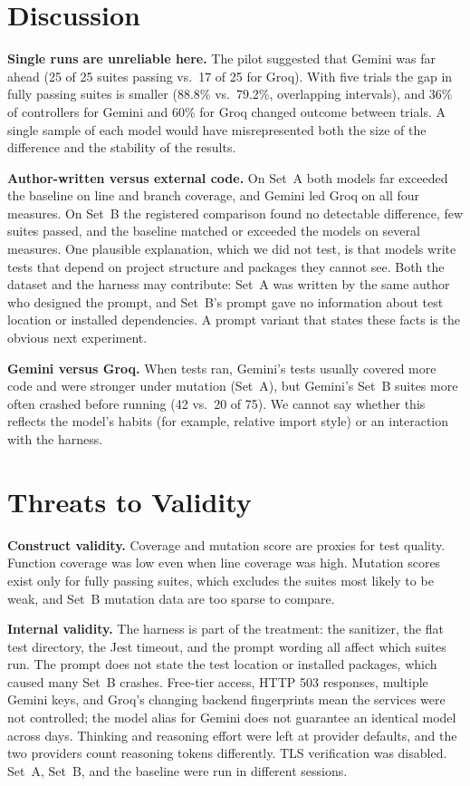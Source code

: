 \documentclass[11pt]{article}
\begin{document}
\section{Discussion}
\textbf{Single runs are unreliable here.} The pilot suggested that Gemini was far ahead (25 of 25 suites passing vs.\ 17 of 25 for Groq). With five trials the gap in fully passing suites is smaller (88.8\% vs.\ 79.2\%, overlapping intervals), and 36\% of controllers for Gemini and 60\% for Groq changed outcome between trials. A single sample of each model would have misrepresented both the size of the difference and the stability of the results.

\textbf{Author-written versus external code.} On Set~A both models far exceeded the baseline on line and branch coverage, and Gemini led Groq on all four measures. On Set~B the registered comparison found no detectable difference, few suites passed, and the baseline matched or exceeded the models on several measures. One plausible explanation, which we did not test, is that models write tests that depend on project structure and packages they cannot see. Both the dataset and the harness may contribute: Set~A was written by the same author who designed the prompt, and Set~B's prompt gave no information about test location or installed dependencies. A prompt variant that states these facts is the obvious next experiment.

\textbf{Gemini versus Groq.} When tests ran, Gemini's tests usually covered more code and were stronger under mutation (Set~A), but Gemini's Set~B suites more often crashed before running (42 vs.\ 20 of 75). We cannot say whether this reflects the model's habits (for example, relative import style) or an interaction with the harness.

\section{Threats to Validity}
\textbf{Construct validity.} Coverage and mutation score are proxies for test quality. Function coverage was low even when line coverage was high. Mutation scores exist only for fully passing suites, which excludes the suites most likely to be weak, and Set~B mutation data are too sparse to compare.

\textbf{Internal validity.} The harness is part of the treatment: the sanitizer, the flat test directory, the Jest timeout, and the prompt wording all affect which suites run. The prompt does not state the test location or installed packages, which caused many Set~B crashes. Free-tier access, HTTP 503 responses, multiple Gemini keys, and Groq's changing backend fingerprints mean the services were not controlled; the model alias for Gemini does not guarantee an identical model across days. Thinking and reasoning effort were left at provider defaults, and the two providers count reasoning tokens differently. TLS verification was disabled. Set~A, Set~B, and the baseline were run in different sessions.
\end{document}
